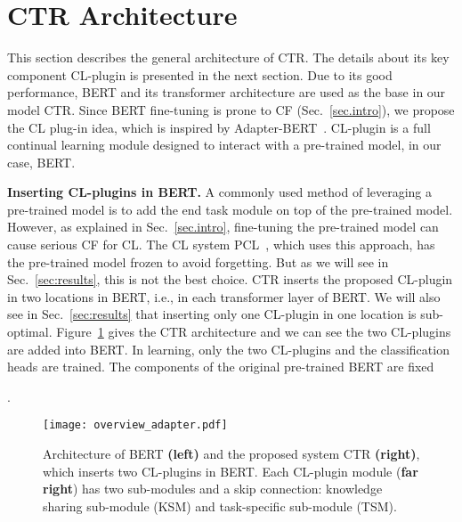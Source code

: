 \documentclass{article}
\begin{document}
\section{CTR Architecture}
\label{Sectionpreliminary}
{\color{black}This section describes the general architecture of CTR. The details about its key component CL-plugin is presented in the next section. Due to its good performance, BERT \cite{DBLP:conf/naacl/DevlinCLT19} and its transformer \cite{vaswani2017attention} architecture are used as the base in our model CTR. Since BERT fine-tuning is prone to CF (Sec.~\ref{sec.intro}), we propose the CL plug-in idea, which is inspired by Adapter-BERT~\cite{Houlsby2019Parameter}. 
CL-plugin is a full continual learning module designed to interact with a pre-trained model, in our case, BERT. 


\textbf{Inserting CL-plugins in BERT.} 
A commonly used method of leveraging a pre-trained model is to add the end task module on top of the pre-trained model. However, as explained in Sec.~\ref{sec.intro}, fine-tuning the pre-trained model can cause serious CF for CL. The CL system PCL~\cite{hu2021continual}, which uses this approach, has the pre-trained model frozen {\color{black}to avoid forgetting}. But as we will see in Sec.~\ref{sec:results}, this is not the best choice. CTR inserts the proposed CL-plugin in two locations in BERT, i.e., in each transformer layer of BERT. We will also see in Sec.~\ref{sec:results} that inserting only one CL-plugin in one location is sub-optimal. 
Figure~\ref{overview_adapter} gives the CTR architecture and we can see the two CL-plugins are added into BERT. In learning, only the two CL-plugins and the classification heads are trained. The components of the original pre-trained BERT are fixed}.  


\begin{figure}[t]
\centering
\texttt{[image: overview\_adapter.pdf]}
\caption{
{\color{black}Architecture of BERT \textbf{(left)} and  
the proposed system CTR \textbf{(right)}, which inserts two CL-plugins in BERT. Each CL-plugin module (\textbf{far right})} has two sub-modules and a skip connection: knowledge sharing sub-module (KSM) and task-specific sub-module (TSM). }
\label{overview_adapter}
\vspace{-4mm}
\end{figure}
\end{document}
